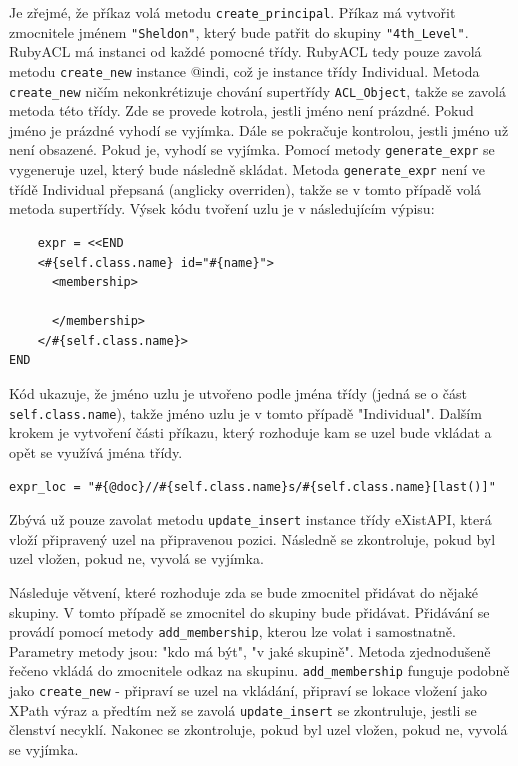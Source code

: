 Je zřejmé, že příkaz volá metodu \verb|create_principal|. Příkaz má vytvořit zmocnitele jménem \verb|"Sheldon"|, který bude patřit do skupiny \verb|"4th_Level"|. RubyACL má instanci od každé pomocné třídy. RubyACL tedy pouze zavolá metodu \verb|create_new| instance @indi, což je instance třídy Individual. Metoda \verb|create_new| ničím nekonkrétizuje chování supertřídy \verb|ACL_Object|, takže se zavolá metoda této třídy. Zde se provede kotrola, jestli jméno není prázdné. Pokud jméno je prázdné vyhodí se vyjímka. Dále se pokračuje kontrolou, jestli jméno už není obsazené. Pokud je, vyhodí se vyjímka. Pomocí metody \verb|generate_expr| se vygeneruje uzel, který bude následně skládat. Metoda \verb|generate_expr| není ve třídě Individual přepsaná (anglicky overriden), takže se v tomto případě volá metoda supertřídy. Výsek kódu tvoření uzlu je v následujícím výpisu:

\begin{lstlisting}
    expr = <<END
    <#{self.class.name} id="#{name}">
      <membership>
        
      </membership>
    </#{self.class.name}>
END
\end{lstlisting}
Kód ukazuje, že jméno uzlu je utvořeno podle jména třídy (jedná se o část \verb|self.class.name|), takže jméno uzlu je v tomto případě "Individual". Dalším krokem je vytvoření části příkazu, který rozhoduje kam se uzel bude vkládat a opět se využívá jména třídy.
\begin{lstlisting}
expr_loc = "#{@doc}//#{self.class.name}s/#{self.class.name}[last()]"
\end{lstlisting}
Zbývá už pouze zavolat metodu \verb|update_insert| instance třídy eXistAPI, která vloží připravený uzel na připravenou pozici. Následně se zkontroluje, pokud byl uzel vložen, pokud ne, vyvolá se vyjímka.

Následuje větvení, které rozhoduje zda se bude zmocnitel přidávat do nějaké skupiny. V tomto případě se zmocnitel do skupiny bude přidávat. Přidávání se provádí pomocí metody \verb|add_membership|, kterou lze volat i samostnatně. Parametry metody jsou: "kdo má být", "v jaké skupině". Metoda zjednodušeně řečeno vkládá do zmocnitele odkaz na skupinu. \verb|add_membership| funguje podobně jako \verb|create_new| - připraví se uzel na vkládání, připraví se lokace vložení jako XPath výraz a předtím než se zavolá \verb|update_insert| se zkontruluje, jestli se členství necyklí. Nakonec se zkontroluje, pokud byl uzel vložen, pokud ne, vyvolá se vyjímka.



